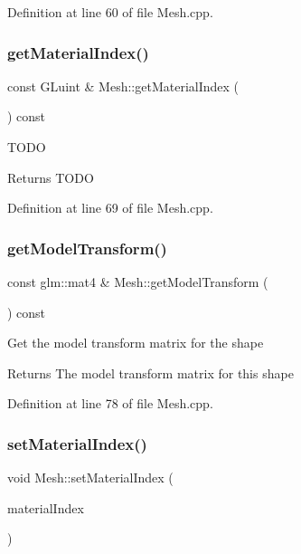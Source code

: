Definition at line 60 of file Mesh.\+cpp.

\mbox{\label{class_mesh_a230c556491bb5d905147159b6a367b9d}} 
\subsubsection{\texorpdfstring{get\+Material\+Index()}{getMaterialIndex()}}
{\footnotesize\ttfamily const G\+Luint \& Mesh\+::get\+Material\+Index (\begin{DoxyParamCaption}{ }\end{DoxyParamCaption}) const}

T\+O\+DO \begin{DoxyReturn}{Returns}
T\+O\+DO 
\end{DoxyReturn}


Definition at line 69 of file Mesh.\+cpp.

\mbox{\label{class_mesh_a77e5abe38ca6e9f4b7949d84cb5735a0}} 
\subsubsection{\texorpdfstring{get\+Model\+Transform()}{getModelTransform()}}
{\footnotesize\ttfamily const glm\+::mat4 \& Mesh\+::get\+Model\+Transform (\begin{DoxyParamCaption}{ }\end{DoxyParamCaption}) const}

Get the model transform matrix for the shape \begin{DoxyReturn}{Returns}
The model transform matrix for this shape 
\end{DoxyReturn}


Definition at line 78 of file Mesh.\+cpp.

\mbox{\label{class_mesh_a9b777ec35644e1e96a6c70531b3cd329}} 
\subsubsection{\texorpdfstring{set\+Material\+Index()}{setMaterialIndex()}}
{\footnotesize\ttfamily void Mesh\+::set\+Material\+Index (\begin{DoxyParamCaption}\item[{G\+Luint}]{material\+Index }\end{DoxyParamCaption})}

